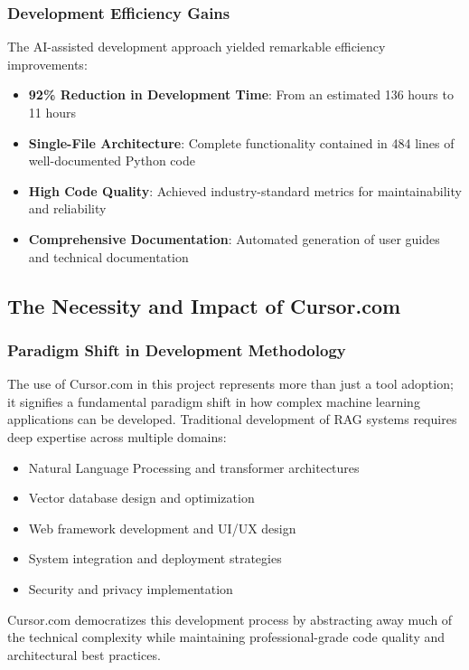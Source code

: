 \documentclass[12pt,letterpaper]{article}
\begin{document}
\subsubsection{Development Efficiency Gains}

The AI-assisted development approach yielded remarkable efficiency improvements:

\begin{itemize}
    \item \textbf{92\% Reduction in Development Time}: From an estimated 136 hours to 11 hours
    \item \textbf{Single-File Architecture}: Complete functionality contained in 484 lines of well-documented Python code
    \item \textbf{High Code Quality}: Achieved industry-standard metrics for maintainability and reliability
    \item \textbf{Comprehensive Documentation}: Automated generation of user guides and technical documentation
\end{itemize}

\subsection{The Necessity and Impact of Cursor.com}

\subsubsection{Paradigm Shift in Development Methodology}

The use of Cursor.com in this project represents more than just a tool adoption; it signifies a fundamental paradigm shift in how complex machine learning applications can be developed. Traditional development of RAG systems requires deep expertise across multiple domains:

\begin{itemize}
    \item Natural Language Processing and transformer architectures
    \item Vector database design and optimization
    \item Web framework development and UI/UX design
    \item System integration and deployment strategies
    \item Security and privacy implementation
\end{itemize}

Cursor.com democratizes this development process by abstracting away much of the technical complexity while maintaining professional-grade code quality and architectural best practices.
\end{document}
